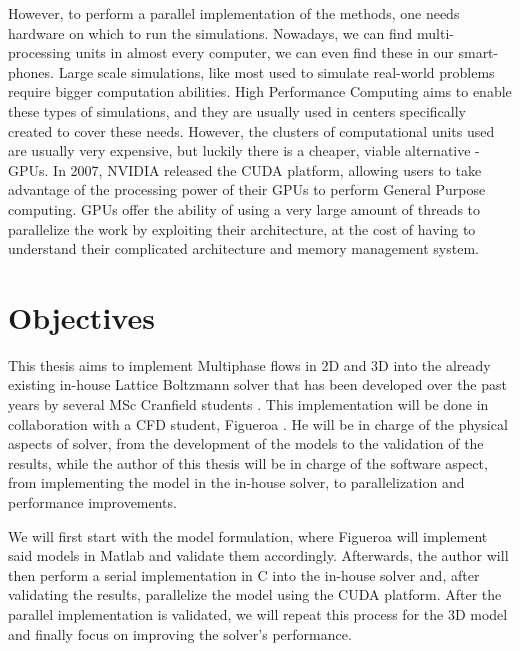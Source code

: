 \documentclass[12pt, openany]{book}
\begin{document}
However, to perform a parallel implementation of the methods, one needs hardware on which to run the simulations. Nowadays, we can find multi-processing units in almost every computer, we can even find these in our smart-phones. Large scale simulations, like most used to simulate real-world problems require bigger computation abilities. High Performance Computing aims to enable these types of simulations, and they are usually used in centers specifically created to cover these needs. However, the clusters of computational units used are usually very expensive, but luckily there is a cheaper, viable alternative - GPUs. In 2007, NVIDIA released the CUDA platform, allowing users to take advantage of the processing power of their GPUs to perform General Purpose computing. GPUs offer the ability of using a very large amount of threads to parallelize the work by exploiting their architecture, at the cost of having to understand their complicated architecture and memory management system. \par

\section{Objectives}
This thesis aims to implement Multiphase flows in 2D and 3D into the already existing in-house Lattice Boltzmann solver that has been developed over the past years by several MSc Cranfield students  \cite{maciej_thesis,koleszar_thesis,jozsa_thesis,szoke_thesis}. This implementation will be done in collaboration with a CFD student, Figueroa \cite{antonioThesis}. He will be in charge of the physical aspects of solver, from the development of the models to the validation of the results, while the author of this thesis will be in charge of the software aspect, from implementing the model in the in-house solver, to parallelization and performance improvements. \par
We will first start with the model formulation, where Figueroa will implement said models in Matlab and validate them accordingly. Afterwards, the author will then perform a serial implementation in C into the in-house solver and, after validating the results, parallelize the model using the CUDA platform. After the parallel implementation is validated, we will repeat this process for the 3D model and finally focus on improving the solver's performance. 
\end{document}
